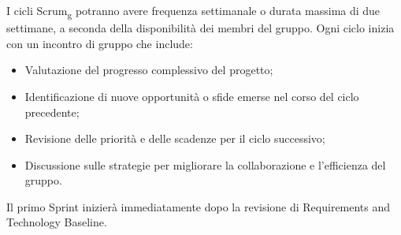 I cicli Scrum\textsubscript{g} potranno avere frequenza settimanale o durata massima di due settimane, a seconda della disponibilità dei membri del gruppo.
Ogni ciclo inizia con un incontro di gruppo che include:
\begin{itemize}
\item Valutazione del progresso complessivo del progetto;
\item Identificazione di nuove opportunità o sfide emerse nel corso del ciclo precedente;
\item Revisione delle priorità e delle scadenze per il ciclo successivo;
\item Discussione sulle strategie per migliorare la collaborazione e l'efficienza del gruppo.
\end{itemize}
Il primo Sprint inizierà immediatamente dopo la revisione di Requirements and Technology Baseline.


